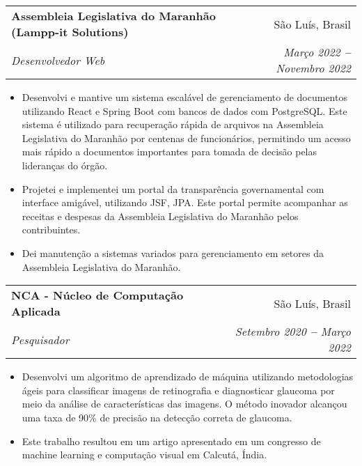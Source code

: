 \documentclass[letterpaper,11pt]{article}
\makeatletter
\newcommand{\resumeItem}[1]{
  \item\small{
    {#1 \vspace{-2pt}}
  }
}
\newcommand{\resumeSubheading}[4]{
  \vspace{-2pt}\item
    \begin{tabular*}{0.97\textwidth}[t]{l@{\extracolsep{\fill}}r}
      \textbf{#1} & #2 \\
      \textit{\small#3} & \textit{\small #4} \\
    \end{tabular*}\vspace{-7pt}
}
\newcommand{\resumeItemListStart}{\begin{itemize}}
\newcommand{\resumeItemListEnd}{\end{itemize}\vspace{-5pt}}
\makeatother
\begin{document}
    \resumeSubheading
      {Assembleia Legislativa do Maranhão (Lampp-it Solutions)}{São Luís, Brasil}
      {Desenvolvedor Web}{Março 2022 \textbf{--} Novembro 2022}
        \resumeItemListStart
            \resumeItem{Desenvolvi e mantive um sistema escalável de gerenciamento de documentos utilizando React e Spring Boot com bancos de dados com PostgreSQL. Este sistema é utilizado para recuperação rápida de arquivos na Assembleia Legislativa do Maranhão por centenas de funcionários, permitindo um acesso mais rápido a documentos importantes para tomada de decisão pelas lideranças do órgão.}
            \resumeItem{Projetei e implementei um portal da transparência governamental com interface amigável, utilizando JSF, JPA. Este portal permite acompanhar as receitas e despesas da Assembleia Legislativa do Maranhão pelos contribuintes.}
            \resumeItem{Dei manutenção a sistemas variados para gerenciamento em setores da Assembleia Legislativa do Maranhão.}
        \resumeItemListEnd

    \resumeSubheading
      {NCA - Núcleo de Computação Aplicada}{São Luís, Brasil}
      {Pesquisador}{Setembro 2020 \textbf{--} Março 2022}
        \resumeItemListStart
            \resumeItem{Desenvolvi um algoritmo de aprendizado de máquina utilizando metodologias ágeis para classificar imagens de retinografia e diagnosticar glaucoma por meio da análise de características das imagens. O método inovador alcançou uma taxa de 90\% de precisão na detecção correta de glaucoma. }
            \resumeItem{Este trabalho resultou em um artigo apresentado em um congresso de machine learning e computação visual em Calcutá, Índia.}
        \resumeItemListEnd
    
\end{document}
